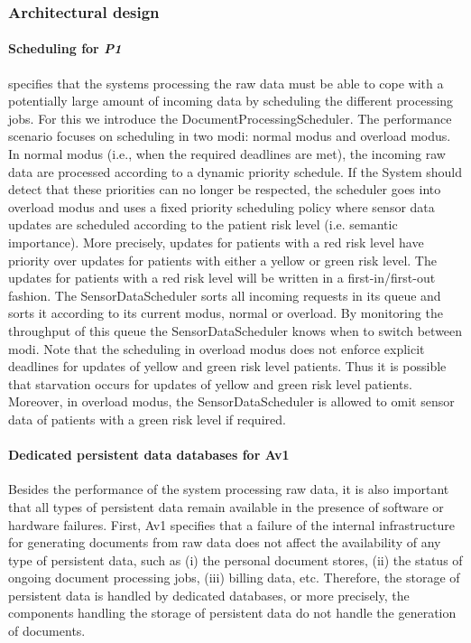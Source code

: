 \documentclass[a4paper,10pt]{article}
\begin{document}
\subsubsection{Architectural design}
\paragraph{Scheduling for \emph{P1}}
 specifies that the systems processing the raw data must be able to cope with a potentially large amount of incoming data by scheduling the different processing jobs. For this we introduce the DocumentProcessingScheduler. The performance scenario focuses on scheduling in two modi: normal modus and overload modus. In normal modus (i.e., when the required deadlines are met), the incoming raw data are processed according to a dynamic priority schedule. If the System should detect that these priorities can no longer be respected, the scheduler goes into overload modus and uses a fixed priority scheduling policy where sensor data updates are scheduled according to the patient risk level (i.e. semantic importance). More precisely, updates for patients with a red risk level have priority over updates for patients with either a yellow or green risk level. The updates for patients with a red risk level will be written in a first-in/first-out fashion. The SensorDataScheduler sorts all incoming requests in its queue and sorts it according to its current modus, normal or overload. By monitoring the throughput of this queue the SensorDataScheduler knows when to switch between modi. Note that the scheduling in overload modus does not enforce explicit deadlines for updates of yellow and green risk level patients. Thus it is possible that starvation occurs for updates of yellow and green risk level patients. Moreover, in overload modus, the SensorDataScheduler is allowed to omit sensor data of patients with a green risk level if required.

\paragraph{Dedicated persistent data databases for Av1}
Besides the performance of the system processing raw data, it is also important that all types of persistent data remain available in the presence of software or hardware failures.
First, Av1 specifies that a failure of the internal infrastructure for generating documents from raw data does not affect the availability of any type of persistent data, such as (i) the personal document stores, (ii) the status of ongoing document processing jobs, (iii) billing data, etc. Therefore, the storage of persistent data is handled by dedicated databases, or more precisely, the components handling the storage of persistent data do not handle the generation of documents.
\end{document}
